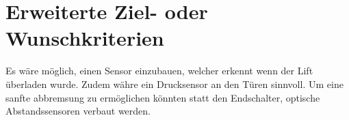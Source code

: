 \section{Erweiterte Ziel- oder Wunschkriterien}

Es wäre möglich, einen Sensor einzubauen, welcher erkennt wenn der Lift überladen wurde. Zudem währe ein Drucksensor an den Türen sinnvoll. Um eine sanfte abbremsung zu ermöglichen könnten statt den Endschalter, optische Abstandssensoren verbaut werden.